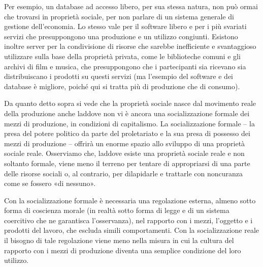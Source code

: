 \documentclass[../main]{subfiles}
\begin{document}
Per esempio, un database ad accesso libero, per sua stessa natura, non può ormai che trovarsi in proprietà sociale, per non parlare di un sistema generale di gestione dell'economia. Lo stesso vale per il software libero e per i più svariati servizi che presuppongono una produzione e un utilizzo congiunti. Esistono inoltre server per la condivisione di risorse che sarebbe inefficiente e svantaggioso utilizzare sulla base della proprietà privata, come le biblioteche comuni e gli archivi di film e musica, che presuppongono che i partecipanti sia ricevano sia distribuiscano i prodotti su questi servizi (ma l'esempio del software e dei database è migliore, poiché qui si tratta più di produzione che di consumo).

Da quanto detto sopra si vede che la proprietà sociale nasce dal movimento reale della produzione anche laddove non vi è ancora una socializzazione formale dei mezzi di produzione, in condizioni di capitalismo. La socializzazione formale – la presa del potere politico da parte del proletariato e la sua presa di possesso dei mezzi di produzione – offrirà un enorme spazio allo sviluppo di una proprietà sociale reale. Osserviamo che, laddove esiste una proprietà sociale reale e non soltanto formale, viene meno il terreno per tentare di appropriarsi di una parte delle risorse sociali o, al contrario, per dilapidarle e trattarle con noncuranza come se fossero «di nessuno».

Con la socializzazione formale è necessaria una regolazione esterna, almeno sotto forma di coscienza morale (in realtà sotto forma di legge e di un sistema coercitivo che ne garantisca l'osservanza), nel rapporto con i mezzi, l'oggetto e i prodotti del lavoro, che escluda simili comportamenti. Con la socializzazione reale il bisogno di tale regolazione viene meno nella misura in cui la cultura del rapporto con i mezzi di produzione diventa una semplice condizione del loro utilizzo.
\end{document}
